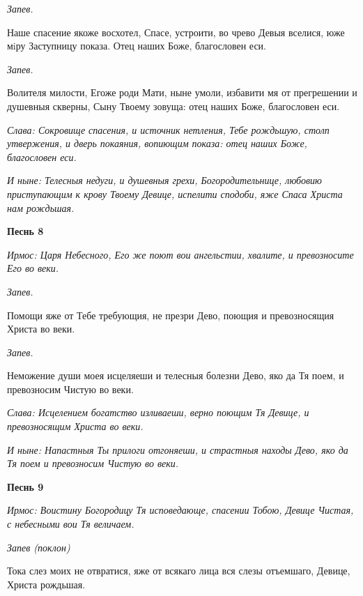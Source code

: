  \itshape Запев.\normalfont{}


   Наше спасение якоже восхотел, Спасе, устроити, во чрево Девыя
вселися, юже мiру Заступницу показа. Отец наших Боже, благословен
еси.


 \itshape Запев.\normalfont{}


   Волителя милости, Егоже роди Мати, ныне умоли, избавити мя от
прегрешении и душевныя скверны, Сыну Твоему зовуща: отец наших Боже,
благословен еси.


 \itshape Слава:\normalfont{} Сокровище спасения, и источник нетления, Тебе рождьшую, столп
утвержения, и дверь покаяния, вопиющим показа: отец наших Боже,
благословен еси.


 \itshape И ныне:\normalfont{} Телесныя недуги, и душевныя грехи, Богородительнице,
любовию приступающим к крову Твоему Девице, испелити сподоби, яже
Спаса Христа нам рождьшая.






 

\bfseries Песнь 8\normalfont{}


 \itshape Ирмос:\normalfont{} Царя Небесного, Его же поют вои ангельстии, хвалите, и
превозносите Его во веки.


 \itshape Запев.\normalfont{}


   Помощи яже от Тебе требующия, не презри Дево, поющия и превозносящия
Христа во веки.


 \itshape Запев.\normalfont{}


   Неможение души моея исцеляеши и телесныя болезни Дево, яко да Тя
поем, и превозносим Чистую во веки.


 \itshape Слава:\normalfont{} Исцелением богатство изливаеши, верно поющим Тя Девице, и
превозносящим Христа во веки.


 \itshape И ныне:\normalfont{} Напастныя Ты прилоги отгоняеши, и страстныя находы Дево,
яко да Тя поем и превозносим Чистую во веки.






 

\bfseries Песнь 9\normalfont{}


 \itshape Ирмос:\normalfont{} Воистину Богородицу Тя исповедающе, спасении Тобою, Девице
Чистая, с небесными вои Тя величаем.


 \itshape Запев (поклон)\normalfont{}


   Тока слез моих не отвратися, яже от всякаго лица вся слезы отъемшаго,
Девице, Христа рождьшая.


